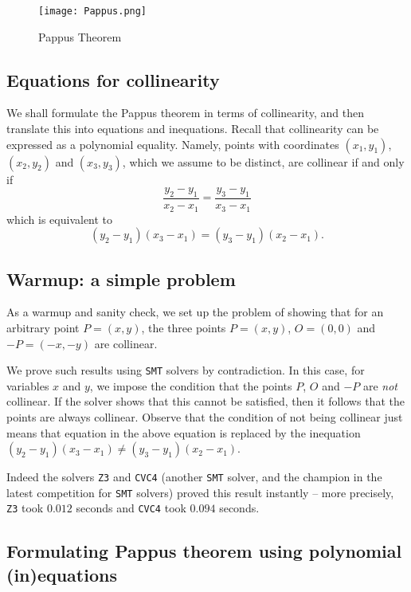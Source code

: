\documentclass{amsart}
\theoremstyle{plain}
\theoremstyle{definition}
\theoremstyle{remark}
\begin{document}
\begin{figure}
	\centering
	\texttt{[image: Pappus.png]}
	\caption{Pappus Theorem}\label{F:pappus}
\end{figure}

\hypertarget{equations-for-collinearity}{%
	\subsection{Equations for
		collinearity}\label{equations-for-collinearity}}

We shall formulate the Pappus theorem in terms of collinearity, and
then translate this into equations and inequations.
Recall that collinearity can be
expressed as a polynomial equality. Namely, points with coordinates
\((x_1, y_1)\), \((x_2, y_2)\) and \((x_3, y_3)\), which we assume to be
distinct, are collinear if and only if
\[\frac{y_2 - y_1}{x_2 - x_1} = \frac{y_3 - y_1}{x_3 - x_1}\] which is
equivalent to \[(y_2 - y_1)(x_3 - x_1) = (y_3 - y_1)(x_2 - x_1).\]

\subsection{Warmup: a simple problem}\label{a-simple-problem}

As a warmup and sanity check, we set up the problem of showing that for
an arbitrary point \(P = (x, y)\), the three points \(P=(x, y)\),
\(O=(0, 0)\) and \(-P=(-x, -y)\) are collinear.

We prove such results using \texttt{SMT} solvers by contradiction. In this case,
for variables \(x\) and \(y\), we impose the condition that the points
\(P\), \(O\) and \(-P\) are \emph{not} collinear. If the solver shows
that this cannot be satisfied, then it follows that the points are
always collinear. Observe that the condition of not being collinear just
means that equation in the above equation is replaced by the inequation
\((y_2 - y_1)(x_3 - x_1) \neq (y_3 - y_1)(x_2 - x_1)\).

Indeed the solvers \texttt{Z3} and \texttt{CVC4} (another \texttt{SMT} solver, and the champion in the
latest competition for \texttt{SMT} solvers) proved this result instantly -- more
precisely, \texttt{Z3} took \(0.012\) seconds and \texttt{CVC4} took \(0.094\) seconds.

\subsection{Formulating Pappus theorem using polynomial (in)equations}
\end{document}
